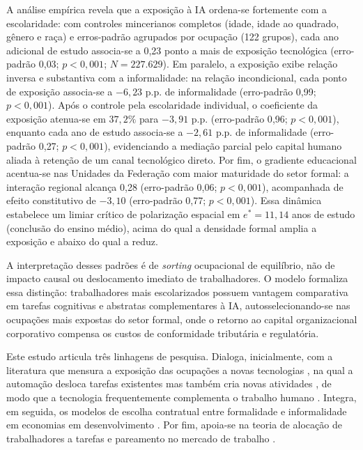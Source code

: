 A análise empírica revela que a exposição à IA ordena-se fortemente com a escolaridade: com controles mincerianos completos (idade, idade ao quadrado, gênero e raça) e erros-padrão agrupados por ocupação (122 grupos), cada ano adicional de estudo associa-se a 0{,}23 ponto a mais de exposição tecnológica (erro-padrão 0{,}03; $p < 0{,}001$; $N = 227.629$). Em paralelo, a exposição exibe relação inversa e substantiva com a informalidade: na relação incondicional, cada ponto de exposição associa-se a $-6{,}23$ p.p. de informalidade (erro-padrão 0{,}99; $p < 0{,}001$). Após o controle pela escolaridade individual, o coeficiente da exposição atenua-se em $37{,}2\%$ para $-3{,}91$ p.p. (erro-padrão 0{,}96; $p < 0{,}001$), enquanto cada ano de estudo associa-se a $-2{,}61$ p.p. de informalidade (erro-padrão 0{,}27; $p < 0{,}001$), evidenciando a mediação parcial pelo capital humano aliada à retenção de um canal tecnológico direto. Por fim, o gradiente educacional acentua-se nas Unidades da Federação com maior maturidade do setor formal: a interação regional alcança 0{,}28 (erro-padrão 0{,}06; $p < 0{,}001$), acompanhada de efeito constitutivo de $-3{,}10$ (erro-padrão 0{,}77; $p < 0{,}001$). Essa dinâmica estabelece um limiar crítico de polarização espacial em $e^* = 11{,}14$ anos de estudo (conclusão do ensino médio), acima do qual a densidade formal amplia a exposição e abaixo do qual a reduz.

A interpretação desses padrões é de \emph{sorting} ocupacional de equilíbrio, não de impacto causal ou deslocamento imediato de trabalhadores. O modelo formaliza essa distinção: trabalhadores mais escolarizados possuem vantagem comparativa em tarefas cognitivas e abstratas complementares à IA, autosselecionando-se nas ocupações mais expostas do setor formal, onde o retorno ao capital organizacional corporativo compensa os custos de conformidade tributária e regulatória.

Este estudo articula três linhagens de pesquisa. Dialoga, inicialmente, com a literatura que mensura a exposição das ocupações a novas tecnologias \citep{frey2017future,acemoglu2018race,acemoglu2022tasks,eloundou2024gpts}, na qual a automação desloca tarefas existentes mas também cria novas atividades \citep{acemoglu2019automation}, de modo que a tecnologia frequentemente complementa o trabalho humano \citep{autor2015why}. Integra, em seguida, os modelos de escolha contratual entre formalidade e informalidade em economias em desenvolvimento \citep{ulyssea2018firms}. Por fim, apoia-se na teoria de alocação de trabalhadores a tarefas e pareamento no mercado de trabalho \citep{acemoglu2011skills,autordorn2013growth}.

